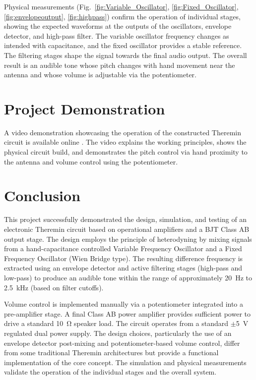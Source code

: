 \documentclass[conference]{IEEEtran}
\begin{document}
Physical measurements (Fig.~\ref{fig:Variable_Oscillator}, \ref{fig:Fixed_Oscillator}, \ref{fig:envelopeoutput}, \ref{fig:highpass}) confirm the operation of individual stages, showing the expected waveforms at the outputs of the oscillators, envelope detector, and high-pass filter. The variable oscillator frequency changes as intended with capacitance, and the fixed oscillator provides a stable reference. The filtering stages shape the signal towards the final audio output. The overall result is an audible tone whose pitch changes with hand movement near the antenna and whose volume is adjustable via the potentiometer.

\section{Project Demonstration}
A video demonstration showcasing the operation of the constructed Theremin circuit is available online \cite{project_video}. The video explains the working principles, shows the physical circuit build, and demonstrates the pitch control via hand proximity to the antenna and volume control using the potentiometer.

\section{Conclusion}
This project successfully demonstrated the design, simulation, and testing of an electronic Theremin circuit based on operational amplifiers and a BJT Class AB output stage. The design employs the principle of heterodyning by mixing signals from a hand-capacitance controlled Variable Frequency Oscillator and a Fixed Frequency Oscillator (Wien Bridge type). The resulting difference frequency is extracted using an envelope detector and active filtering stages (high-pass and low-pass) to produce an audible tone within the range of approximately \SI{20}{Hz} to \SI{2.5}{kHz} (based on filter cutoffs).

Volume control is implemented manually via a potentiometer integrated into a pre-amplifier stage. A final Class AB power amplifier provides sufficient power to drive a standard \SI{10}{\ohm} speaker load. The circuit operates from a standard $\pm$\SI{5}{\volt} regulated dual power supply. The design choices, particularly the use of an envelope detector post-mixing and potentiometer-based volume control, differ from some traditional Theremin architectures but provide a functional implementation of the core concept. The simulation and physical measurements validate the operation of the individual stages and the overall system.
\end{document}
